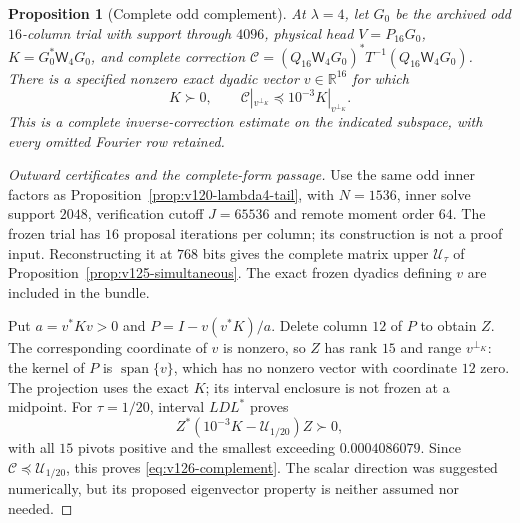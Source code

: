 \documentclass[11pt]{article}
\newtheorem{proposition}[theorem]{Proposition}
\theoremstyle{remark}
\begin{document}
\begin{proposition}[Complete odd complement]
\label{prop:v126-odd-complement}
At $\lambda=4$, let $G_0$ be the archived odd $16$-column trial
with support through $4096$, physical head $V=P_{16}G_0$,
$K=G_0^*\mathsf W_4G_0$, and complete correction
$\mathcal C=(Q_{16}\mathsf W_4G_0)^*T^{-1}
                (Q_{16}\mathsf W_4G_0)$.
There is a specified nonzero exact dyadic vector $v\in\mathbb R^{16}$
for which
\begin{equation}\label{eq:v126-complement}
 K\succ0,\qquad
 \mathcal C|_{v^{\perp_K}}\preceq10^{-3}K|_{v^{\perp_K}}.
\end{equation}
This is a complete inverse-correction estimate on the indicated
subspace, with every omitted Fourier row retained.
\end{proposition}
\begin{proof}[Outward certificates and the complete-form passage]
Use the same odd inner factors as
Proposition~\ref{prop:v120-lambda4-tail}, with $N=1536$,
inner solve support $2048$, verification cutoff $J=65536$ and
remote moment order $64$.  The frozen trial has $16$ proposal
iterations per column; its construction is not a proof input.
Reconstructing it at $768$ bits gives the complete matrix upper
$\mathcal U_\tau$ of Proposition~\ref{prop:v125-simultaneous}.
The exact frozen dyadics defining $v$ are included in the bundle.

Put $a=v^*Kv>0$ and $P=I-v(v^*K)/a$.  Delete column $12$ of
$P$ to obtain $Z$.  The corresponding coordinate of $v$ is nonzero,
so $Z$ has rank $15$ and range $v^{\perp_K}$: the kernel of $P$
is $\operatorname{span}\{v\}$, which has no nonzero vector
with coordinate $12$ zero.  The projection uses the exact $K$;
its interval enclosure is not frozen at a midpoint.  For
$\tau=1/20$, interval $LDL^*$ proves
\[
 Z^*(10^{-3}K-\mathcal U_{1/20})Z\succ0,
\]
with all $15$ pivots positive and the smallest exceeding
$0.0004086079$.  Since $\mathcal C\preceq\mathcal U_{1/20}$,
this proves \eqref{eq:v126-complement}.  The scalar direction
was suggested numerically, but its proposed eigenvector property
is neither assumed nor needed.

\end{proof}
\end{document}
